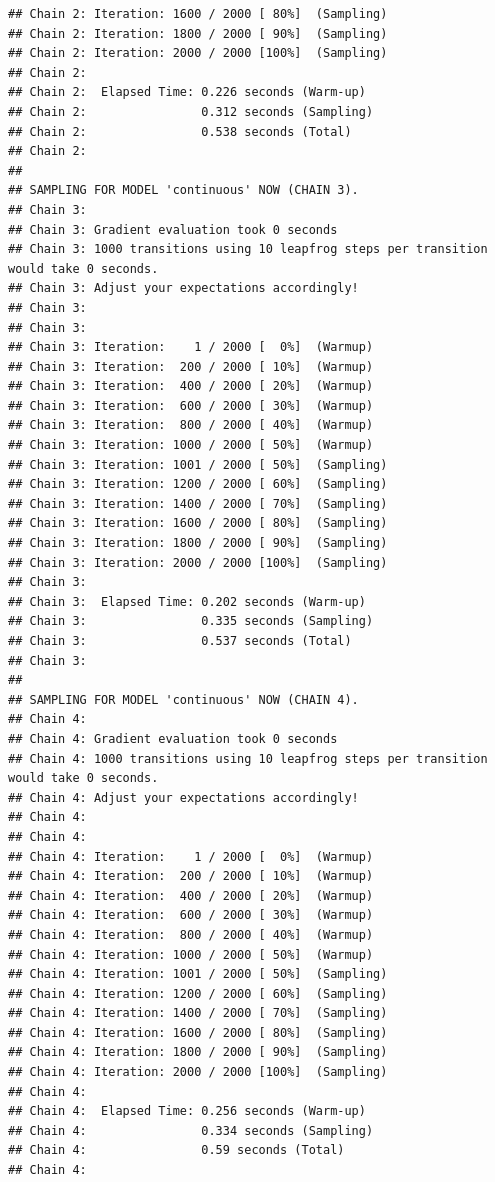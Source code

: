 \documentclass[
]{article}
\begin{document}
\begin{verbatim}
## Chain 2: Iteration: 1600 / 2000 [ 80%]  (Sampling)
## Chain 2: Iteration: 1800 / 2000 [ 90%]  (Sampling)
## Chain 2: Iteration: 2000 / 2000 [100%]  (Sampling)
## Chain 2: 
## Chain 2:  Elapsed Time: 0.226 seconds (Warm-up)
## Chain 2:                0.312 seconds (Sampling)
## Chain 2:                0.538 seconds (Total)
## Chain 2: 
## 
## SAMPLING FOR MODEL 'continuous' NOW (CHAIN 3).
## Chain 3: 
## Chain 3: Gradient evaluation took 0 seconds
## Chain 3: 1000 transitions using 10 leapfrog steps per transition would take 0 seconds.
## Chain 3: Adjust your expectations accordingly!
## Chain 3: 
## Chain 3: 
## Chain 3: Iteration:    1 / 2000 [  0%]  (Warmup)
## Chain 3: Iteration:  200 / 2000 [ 10%]  (Warmup)
## Chain 3: Iteration:  400 / 2000 [ 20%]  (Warmup)
## Chain 3: Iteration:  600 / 2000 [ 30%]  (Warmup)
## Chain 3: Iteration:  800 / 2000 [ 40%]  (Warmup)
## Chain 3: Iteration: 1000 / 2000 [ 50%]  (Warmup)
## Chain 3: Iteration: 1001 / 2000 [ 50%]  (Sampling)
## Chain 3: Iteration: 1200 / 2000 [ 60%]  (Sampling)
## Chain 3: Iteration: 1400 / 2000 [ 70%]  (Sampling)
## Chain 3: Iteration: 1600 / 2000 [ 80%]  (Sampling)
## Chain 3: Iteration: 1800 / 2000 [ 90%]  (Sampling)
## Chain 3: Iteration: 2000 / 2000 [100%]  (Sampling)
## Chain 3: 
## Chain 3:  Elapsed Time: 0.202 seconds (Warm-up)
## Chain 3:                0.335 seconds (Sampling)
## Chain 3:                0.537 seconds (Total)
## Chain 3: 
## 
## SAMPLING FOR MODEL 'continuous' NOW (CHAIN 4).
## Chain 4: 
## Chain 4: Gradient evaluation took 0 seconds
## Chain 4: 1000 transitions using 10 leapfrog steps per transition would take 0 seconds.
## Chain 4: Adjust your expectations accordingly!
## Chain 4: 
## Chain 4: 
## Chain 4: Iteration:    1 / 2000 [  0%]  (Warmup)
## Chain 4: Iteration:  200 / 2000 [ 10%]  (Warmup)
## Chain 4: Iteration:  400 / 2000 [ 20%]  (Warmup)
## Chain 4: Iteration:  600 / 2000 [ 30%]  (Warmup)
## Chain 4: Iteration:  800 / 2000 [ 40%]  (Warmup)
## Chain 4: Iteration: 1000 / 2000 [ 50%]  (Warmup)
## Chain 4: Iteration: 1001 / 2000 [ 50%]  (Sampling)
## Chain 4: Iteration: 1200 / 2000 [ 60%]  (Sampling)
## Chain 4: Iteration: 1400 / 2000 [ 70%]  (Sampling)
## Chain 4: Iteration: 1600 / 2000 [ 80%]  (Sampling)
## Chain 4: Iteration: 1800 / 2000 [ 90%]  (Sampling)
## Chain 4: Iteration: 2000 / 2000 [100%]  (Sampling)
## Chain 4: 
## Chain 4:  Elapsed Time: 0.256 seconds (Warm-up)
## Chain 4:                0.334 seconds (Sampling)
## Chain 4:                0.59 seconds (Total)
## Chain 4:
\end{verbatim}
\end{document}
